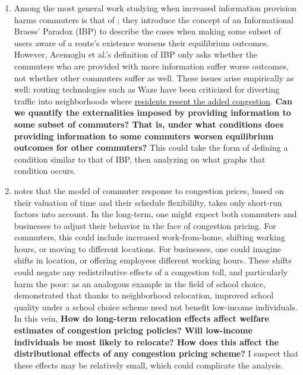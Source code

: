 \documentclass[JEL]{AEA}
\begin{document}
\begin{enumerate}
\item Among the most general work studying when increased information provision harms commuters is that of \cite{acemoglu-2016}; they introduce the concept of an Informational Braess' Paradox (IBP) to describe the cases when making some subset of users aware of a route's existence worsens their equilibrium outcomes. However, Acemoglu et al.'s definition of IBP only asks whether the commuters who are provided with more information suffer worse outcomes, not whether other commuters suffer as well. These issues arise empirically as well: routing technologies such as Waze have been criticized for diverting traffic into neighborhoods where \href{https://www.washingtonpost.com/local/traffic-weary-homeowners-and-waze-are-at-war-again-guess-whos-winning/2016/06/05/c466df46-299d-11e6-b989-4e5479715b54_story.html}{residents resent the added congestion}. \textbf{Can we quantify the externalities imposed by providing information to some subset of commuters? That is, under what conditions does providing information to some commuters worsen equilibrium outcomes for other commuters?} This could take the form of defining a condition similar to that of IBP, then analyzing on what graphs that condition occurs.

\item \cite{kreindler-2018} notes that the model of commuter response to congestion prices, based on their valuation of time and their schedule flexibililty, takes only short-run factors into account. In the long-term, one might expect both commuters and businesses to adjust their behavior in the face of congestion pricing. For commuters, this could include increased work-from-home, shifting working hours, or moving to different locations. For businesses, one could imagine shifts in location, or offering employees different working hours. These shifts could negate any redistributive effects of a congestion toll, and particularly harm the poor: as an analogous example in the field of school choice, \cite{avery-2021} demonstrated that thanks to neighborhood relocation, improved school quality under a school choice scheme need not benefit low-income individuals. In this vein, \textbf{How do long-term relocation effects affect welfare estimates of congestion pricing policies? Will low-income individuals be most likely to relocate? How does this affect the distributional effects of any congestion pricing scheme?} I suspect that these effects may be relatively small, which could complicate the analysis.

\end{enumerate}






\end{document}
